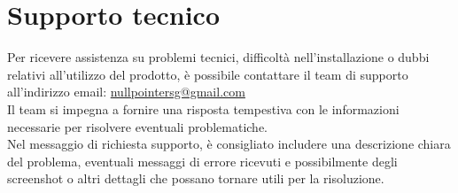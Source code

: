 \section{Supporto tecnico}
Per ricevere assistenza su problemi tecnici, difficoltà nell’installazione o dubbi relativi all’utilizzo del prodotto, è possibile contattare il team di supporto all’indirizzo email: \href{mailto:nullpointersg@gmail.com?subject=Problema}{nullpointersg@gmail.com} \\
Il team si impegna a fornire una risposta tempestiva con le informazioni necessarie per risolvere eventuali problematiche.\\
Nel messaggio di richiesta supporto, è consigliato includere una descrizione chiara del problema, eventuali messaggi di errore ricevuti e possibilmente degli screenshot o altri dettagli che possano tornare utili per la risoluzione.
